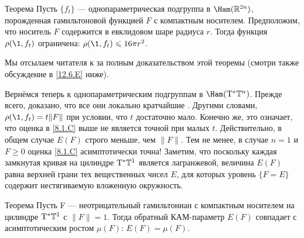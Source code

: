 \begin{thm}{Теорема}\label{8.2.A}
Пусть $\{f_t\}$ --- однопараметрическая подгруппа в $\Ham (\RR^{2n})$,
порожденная гамильтоновой функцией $F$ с компактным носителем. 
Предположим, что носитель $F$ содержится в евклидовом шаре радиуса
$r$. 
Тогда функция $\rho (\1, f_t)$ ограничена: $\rho (\1, f_t) \z\le 16\pi
r^2$. 
\end{thm}

Мы отсылаем читателя к \cite[с. 177]{HZ} за полным доказательством
этой теоремы (смотри также обсуждение в \ref{12.6.E} ниже). 

Вернёмся теперь к однопараметрическим подгруппам в $\Ham (\T^\ast \TT^n)$.
Прежде всего, доказано, что все они локально кратчайшие \cite{LM2}.
Другими словами, $\rho (\1, f_t) = t \| F \|$ при условии, что $t$
достаточно мало. 
Конечно же, это означает, что оценка в \ref{8.1.C} выше не является
точной при малых $t$. 
Действительно, в общем случае $E (F)$ строго меньше, чем $\| F \|$.
Тем не менее, в случае $n = 1$ и $F \ge 0$ оценка \ref{8.1.C}
асимптотически точна! 
Заметим, что поскольку каждая замкнутая кривая на цилиндре $\mathrm{T}^\ast
\mathbb{T}^1$ является лагранжевой, величина $E (F)$ равна верхней грани тех
вещественных чисел $E$, для которых уровень $\{F = E\}$ содержит
нестягиваемую вложенную окружность. 

\begin{thm}[(\cite{PS})]{Теорема}\label{8.2.B}
  Пусть F --- неотрицательный гамильтониан с компактным носителем на
  цилиндре $\mathrm{T}^\ast \mathbb{T}^1$ с $\| F \| = 1$. 
  Тогда обратный КАМ-параметр $E (F)$ совпадает с асимптотическим
  ростом $\mu (F)$: $E (F) = \mu (F)$. 
\end{thm}

